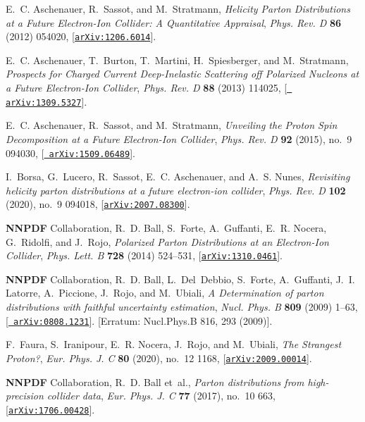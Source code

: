 \documentclass[11pt,a4paper]{article}
\begin{document}
\begin{thebibliography}{10}
  E.~C. Aschenauer, R.~Sassot, and M.~Stratmann, {\it {Helicity Parton
    Distributions at a Future Electron-Ion Collider: A Quantitative Appraisal}},
    {\em Phys. Rev. D} {\bf 86} (2012) 054020,
    [\href{http://arxiv.org/abs/1206.6014}{{\tt arXiv:1206.6014}}].
  
  E.~C. Aschenauer, T.~Burton, T.~Martini, H.~Spiesberger, and M.~Stratmann, {\it
    {Prospects for Charged Current Deep-Inelastic Scattering off Polarized
    Nucleons at a Future Electron-Ion Collider}},  {\em Phys. Rev. D} {\bf 88}
    (2013) 114025, [\href{http://arxiv.org/abs/1309.5327}{{\tt
    arXiv:1309.5327}}].
  
  E.~C. Aschenauer, R.~Sassot, and M.~Stratmann, {\it {Unveiling the Proton Spin
    Decomposition at a Future Electron-Ion Collider}},  {\em Phys. Rev. D} {\bf
    92} (2015), no.~9 094030, [\href{http://arxiv.org/abs/1509.06489}{{\tt
    arXiv:1509.06489}}].
  
  I.~Borsa, G.~Lucero, R.~Sassot, E.~C. Aschenauer, and A.~S. Nunes, {\it
    {Revisiting helicity parton distributions at a future electron-ion
    collider}},  {\em Phys. Rev. D} {\bf 102} (2020), no.~9 094018,
    [\href{http://arxiv.org/abs/2007.08300}{{\tt arXiv:2007.08300}}].
  
  {\bf NNPDF} Collaboration, R.~D. Ball, S.~Forte, A.~Guffanti, E.~R. Nocera,
    G.~Ridolfi, and J.~Rojo, {\it {Polarized Parton Distributions at an
    Electron-Ion Collider}},  {\em Phys. Lett. B} {\bf 728} (2014) 524--531,
    [\href{http://arxiv.org/abs/1310.0461}{{\tt arXiv:1310.0461}}].
  
  {\bf NNPDF} Collaboration, R.~D. Ball, L.~Del~Debbio, S.~Forte, A.~Guffanti,
    J.~I. Latorre, A.~Piccione, J.~Rojo, and M.~Ubiali, {\it {A Determination of
    parton distributions with faithful uncertainty estimation}},  {\em Nucl.
    Phys. B} {\bf 809} (2009) 1--63, [\href{http://arxiv.org/abs/0808.1231}{{\tt
    arXiv:0808.1231}}]. [Erratum: Nucl.Phys.B 816, 293 (2009)].
  
  F.~Faura, S.~Iranipour, E.~R. Nocera, J.~Rojo, and M.~Ubiali, {\it {The
    Strangest Proton?}},  {\em Eur. Phys. J. C} {\bf 80} (2020), no.~12 1168,
    [\href{http://arxiv.org/abs/2009.00014}{{\tt arXiv:2009.00014}}].
  
  {\bf NNPDF} Collaboration, R.~D. Ball et~al., {\it {Parton distributions from
    high-precision collider data}},  {\em Eur. Phys. J. C} {\bf 77} (2017),
    no.~10 663, [\href{http://arxiv.org/abs/1706.00428}{{\tt arXiv:1706.00428}}].
  

\end{thebibliography}
\end{document}
